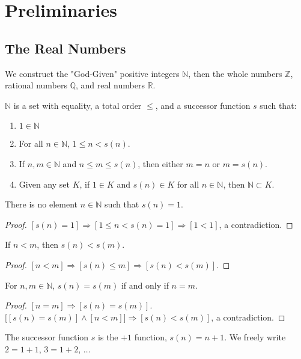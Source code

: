 \documentclass[crop=false,class=article,oneside]{standalone}
\begin{document}
    \ifx\ifworkmasterswork\undefined
        \section*{Preliminaries}
        \setcounter{section}{1}
    \fi
    \subsection{The Real Numbers}
    We construct the "God-Given" positive integers $\mathbb{N}$, then the whole numbers $\mathbb{Z}$, rational numbers $\mathbb{Q}$, and real numbers $\mathbb{R}$.
    \begin{definition}
    $\mathbb{N}$ is a set with equality, a total order $\leq$, and a successor function $s$ such that:
    \begin{enumerate}
    \item $1\in \mathbb{N}$
    \item For all $n\in \mathbb{N}$, $1\leq n < s(n)$.
    \item If $n,m\in \mathbb{N}$ and $n\leq m \leq s(n)$, then either $m=n$ or $m=s(n)$.
    \item Given any set $K$, if $1\in K$ and $s(n)\in K$ for all $n\in \mathbb{N}$, then $\mathbb{N}\subset K$.
    \end{enumerate}
    \end{definition}
    \begin{theorem}
    There is no element $n\in \mathbb{N}$ such that $s(n) =1$.
    \end{theorem}
    \begin{proof}
    $[s(n) = 1]\Rightarrow [1\leq n < s(n)=1]\Rightarrow[1<1]$, a contradiction.
    \end{proof}
    \begin{theorem}
    If $n<m$, then $s(n)< s(m)$.
    \end{theorem}
    \begin{proof}
    $[n<m]\Rightarrow [s(n)\leq m] \Rightarrow [s(n) < s(m)]$.
    \end{proof}
    \begin{theorem}
    For $n,m\in \mathbb{N}$, $s(n)=s(m)$ if and only if $n=m$.
    \end{theorem}
    \begin{proof}
    $[n=m]\Rightarrow [s(n)=s(m)]$. $\big[[s(n)=s(m)]\land [n<m]\big] \Rightarrow [s(n)<s(m)]$, a contradiction.
    \end{proof}
    \begin{remark}
    The successor function $s$ is the $+1$ function, $s(n)=n+1$. We freely write $2=1+1$, $3=1+2$, $\hdots$
    \end{remark}
\end{document}
